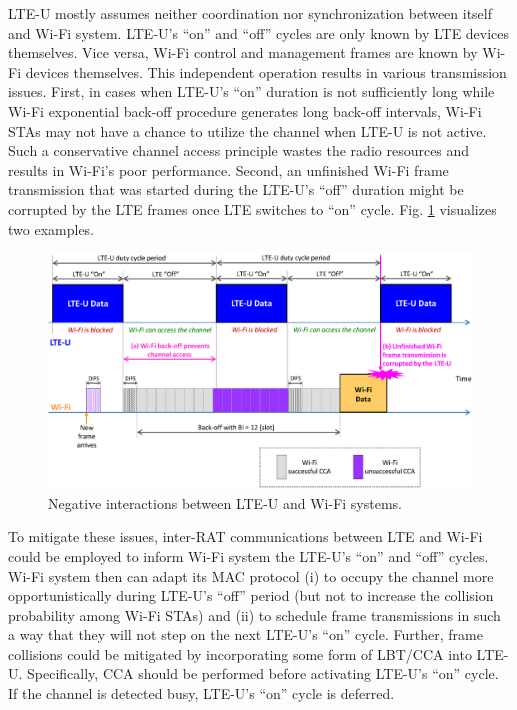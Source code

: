 \mbox{LTE-U} mostly assumes neither coordination nor synchronization between itself and \mbox{Wi-Fi} system. \mbox{LTE-U}'s ``on'' and ``off'' cycles are only known by LTE devices themselves. Vice versa, \mbox{Wi-Fi} control and management frames are known by \mbox{Wi-Fi} devices themselves. This independent operation results in various transmission issues. First, in cases when \mbox{LTE-U}'s ``on'' duration is not sufficiently long while \mbox{Wi-Fi} exponential back-off procedure generates long back-off intervals, \mbox{Wi-Fi} STAs may not have a chance to utilize the channel when \mbox{LTE-U} is not active. Such a conservative channel access principle wastes the radio resources and results in \mbox{Wi-Fi}'s poor performance. Second, an unfinished \mbox{Wi-Fi} frame transmission that was started during the \mbox{LTE-U}'s ``off'' duration might be corrupted by the LTE frames once LTE switches to ``on'' cycle. Fig. \ref{figs:LTE-U-enhancement1} visualizes two examples.
\begin{figure}[!ht]
	\centering
	\includegraphics[width=1.0\columnwidth]{figs/LTE-U-enhancement1}
	\caption{Negative interactions between \mbox{LTE-U} and \mbox{Wi-Fi} systems.}
	\label{figs:LTE-U-enhancement1}
\end{figure}

To mitigate these issues, inter-RAT communications between LTE and \mbox{Wi-Fi} could be employed to inform \mbox{Wi-Fi} system the \mbox{LTE-U}'s ``on'' and ``off'' cycles. \mbox{Wi-Fi} system then can adapt its MAC protocol (i) to occupy the channel more opportunistically during \mbox{LTE-U}'s ``off'' period (but not to increase the collision probability among \mbox{Wi-Fi} STAs) and (ii) to schedule frame transmissions in such a way that they will not step on the next \mbox{LTE-U}'s ``on'' cycle. Further, frame collisions could be mitigated by incorporating some form of LBT/CCA into \mbox{LTE-U}. Specifically, CCA should be performed before activating \mbox{LTE-U}'s ``on'' cycle. If the channel is detected busy, \mbox{LTE-U}'s ``on'' cycle is deferred.


